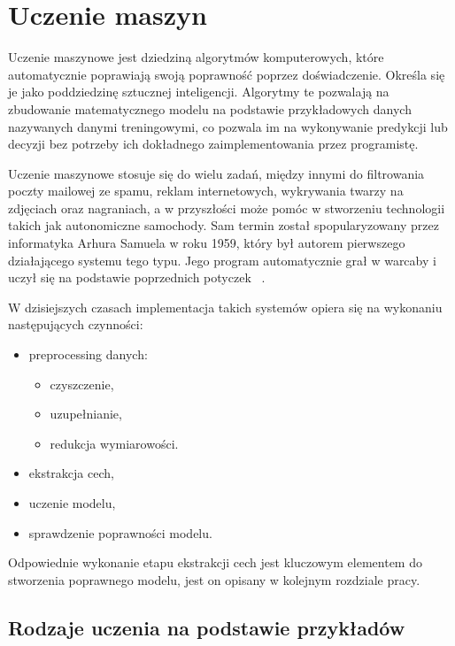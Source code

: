\chapter{Uczenie maszyn}
Uczenie maszynowe jest dziedziną algorytmów komputerowych, które automatycznie poprawiają swoją poprawność poprzez doświadczenie. 
Określa się je jako poddziedzinę sztucznej inteligencji. Algorytmy te pozwalają na zbudowanie matematycznego modelu na podstawie 
przykładowych danych nazywanych danymi treningowymi, co pozwala im na wykonywanie predykcji lub decyzji bez potrzeby ich dokładnego 
zaimplementowania przez programistę. 


Uczenie maszynowe stosuje się do wielu zadań, między innymi do filtrowania poczty mailowej ze spamu, reklam internetowych, 
wykrywania twarzy na zdjęciach oraz nagraniach, a w przyszłości może pomóc w stworzeniu technologii takich jak 
autonomiczne samochody. Sam termin został spopularyzowany przez informatyka Arhura Samuela w roku 1959, który był autorem pierwszego działającego 
systemu tego typu. Jego program automatycznie grał w warcaby i uczył się na podstawie poprzednich potyczek ~\cite{MLBasics}. 


W dzisiejszych czasach implementacja takich systemów opiera się na wykonaniu następujących czynności:
\begin{itemize}
    \item preprocessing danych:
    \begin{itemize}
        \item czyszczenie,
        \item uzupełnianie,
        \item redukcja wymiarowości.
    \end{itemize}
    \item ekstrakcja cech,
    \item uczenie modelu,
    \item sprawdzenie poprawności modelu.
\end{itemize}
Odpowiednie wykonanie etapu ekstrakcji cech jest kluczowym elementem do stworzenia poprawnego modelu, jest
on opisany w kolejnym rozdziale pracy. 
\section{Rodzaje uczenia na podstawie przykładów}

